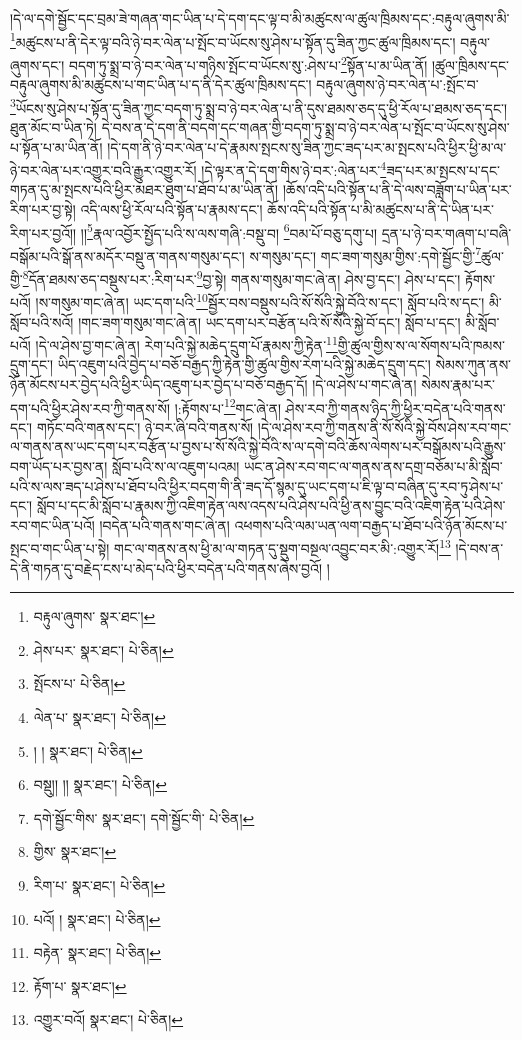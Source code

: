 །དེ་ལ་དགེ་སྦྱོང་དང་བྲམ་ཟེ་གཞན་གང་ཡིན་པ་དེ་དག་དང་ལྟ་བ་མི་མཚུངས་ལ་ཚུལ་ཁྲིམས་དང་:བརྟུལ་ཞུགས་མི་\footnote{བརྟུལ་ཞུགས་  སྣར་ཐང་། }མཚུངས་པ་ནི་དེར་ལྟ་བའི་ཉེ་བར་ལེན་པ་སྤོང་བ་ཡོངས་སུ་ཤེས་པ་སྟོན་དུ་ཟིན་ཀྱང་ཚུལ་ཁྲིམས་དང་། བརྟུལ་ཞུགས་དང་། བདག་ཏུ་སྨྲ་བ་ཉེ་བར་ལེན་པ་གཉིས་སྤོང་བ་ཡོངས་སུ་:ཤེས་པ་\footnote{ཤེས་པར་  སྣར་ཐང་།  པེ་ཅིན། }སྟོན་པ་མ་ཡིན་ནོ། །ཚུལ་ཁྲིམས་དང་བརྟུལ་ཞུགས་མི་མཚུངས་པ་གང་ཡིན་པ་ད་ནི་དེར་ཚུལ་ཁྲིམས་དང་། བརྟུལ་ཞུགས་ཉེ་བར་ལེན་པ་:སྤོང་བ་\footnote{སྤོངས་པ་  པེ་ཅིན། }ཡོངས་སུ་ཤེས་པ་སྟོན་དུ་ཟིན་ཀྱང་བདག་ཏུ་སྨྲ་བ་ཉེ་བར་ལེན་པ་ནི་དུས་ཐམས་ཅད་དུ་ཕྱི་རོལ་པ་ཐམས་ཅད་དང་། ཐུན་མོང་བ་ཡིན་ཏེ། དེ་བས་ན་དེ་དག་ནི་བདག་དང་གཞན་གྱི་བདག་ཏུ་སྨྲ་བ་ཉེ་བར་ལེན་པ་སྤོང་བ་ཡོངས་སུ་ཤེས་པ་སྟོན་པ་མ་ཡིན་ནོ། །དེ་དག་ནི་ཉེ་བར་ལེན་པ་དེ་རྣམས་སྤངས་སུ་ཟིན་ཀྱང་ཟད་པར་མ་སྤངས་པའི་ཕྱིར་ཕྱི་མ་ལ་ཉེ་བར་ལེན་པར་འགྱུར་བའི་རྒྱུར་འགྱུར་རོ། །དེ་ལྟར་ན་དེ་དག་གིས་ཉེ་བར་:ལེན་པར་\footnote{ལེན་པ་  སྣར་ཐང་།  པེ་ཅིན། }ཟད་པར་མ་སྤངས་པ་དང་གཏན་དུ་མ་སྤངས་པའི་ཕྱིར་མཐར་ཐུག་པ་ཐོབ་པ་མ་ཡིན་ནོ། །ཆོས་འདི་པའི་སྟོན་པ་ནི་དེ་ལས་བཟློག་པ་ཡིན་པར་རིག་པར་བྱ་སྟེ། འདི་ལས་ཕྱི་རོལ་པའི་སྟོན་པ་རྣམས་དང་། ཆོས་འདི་པའི་སྟོན་པ་མི་མཚུངས་པ་ནི་དེ་ཡིན་པར་རིག་པར་བྱའོ།། །།\footnote{། །  སྣར་ཐང་།  པེ་ཅིན། }རྣལ་འབྱོར་སྤྱོད་པའི་ས་ལས་གཞི་:བསྡུ་བ། \footnote{བསྡུ།། །།   སྣར་ཐང་།  པེ་ཅིན། }བམ་པོ་བཅུ་དགུ་པ། དྲན་པ་ཉེ་བར་གཞག་པ་བཞི་བསྒོམ་པའི་སྒོ་ནས་མདོར་བསྡུ་ན་གནས་གསུམ་དང་། ས་གསུམ་དང་། གང་ཟག་གསུམ་གྱིས་:དགེ་སྦྱོང་གྱི་\footnote{དགེ་སྦྱོང་གིས་  སྣར་ཐང་། དགེ་སྦྱོང་གི་  པེ་ཅིན། }ཚུལ་གྱི་\footnote{གྱིས་  སྣར་ཐང་། }དོན་ཐམས་ཅད་བསྡུས་པར་:རིག་པར་\footnote{རིག་པ་  སྣར་ཐང་།  པེ་ཅིན། }བྱ་སྟེ། གནས་གསུམ་གང་ཞེ་ན། ཤེས་བྱ་དང་། ཤེས་པ་དང་། རྟོགས་པའོ། །ས་གསུམ་གང་ཞེ་ན། ཡང་དག་པའི་\footnote{པའོ། །  སྣར་ཐང་།  པེ་ཅིན། }སྦྱོར་བས་བསྡུས་པའི་སོ་སོའི་སྐྱེ་བོའི་ས་དང་། སློབ་པའི་ས་དང་། མི་སློབ་པའི་སའོ། །གང་ཟག་གསུམ་གང་ཞེ་ན། ཡང་དག་པར་བརྩོན་པའི་སོ་སོའི་སྐྱེ་བོ་དང་། སློབ་པ་དང་། མི་སློབ་པའོ། །དེ་ལ་ཤེས་བྱ་གང་ཞེ་ན། རེག་པའི་སྐྱེ་མཆེད་དྲུག་པོ་རྣམས་ཀྱི་རྟེན་\footnote{བརྟེན་  སྣར་ཐང་།  པེ་ཅིན། }གྱི་ཚུལ་གྱིས་ས་ལ་སོགས་པའི་ཁམས་དྲུག་དང་། ཡིད་འཇུག་པའི་བྱེད་པ་བཅོ་བརྒྱད་ཀྱི་རྟེན་གྱི་ཚུལ་གྱིས་རེག་པའི་སྐྱེ་མཆེད་དྲུག་དང་། སེམས་ཀུན་ནས་ཉོན་མོངས་པར་བྱེད་པའི་ཕྱིར་ཡིད་འཇུག་པར་བྱེད་པ་བཅོ་བརྒྱད་དོ། །དེ་ལ་ཤེས་པ་གང་ཞེ་ན། སེམས་རྣམ་པར་དག་པའི་ཕྱིར་ཤེས་རབ་ཀྱི་གནས་སོ། །:རྟོགས་པ་\footnote{རྟོག་པ་  སྣར་ཐང་། }གང་ཞེ་ན། ཤེས་རབ་ཀྱི་གནས་ཉིད་ཀྱི་ཕྱིར་བདེན་པའི་གནས་དང་། གཏོང་བའི་གནས་དང་། ཉེ་བར་ཞི་བའི་གནས་སོ། །དེ་ལ་ཤེས་རབ་ཀྱི་གནས་ནི་སོ་སོའི་སྐྱེ་བོས་ཤེས་རབ་གང་ལ་གནས་ནས་ཡང་དག་པར་བརྩོན་པ་བྱས་པ་སོ་སོའི་སྐྱེ་བོའི་ས་ལ་དགེ་བའི་ཆོས་ལེགས་པར་བསྒོམས་པའི་རྒྱུས་བག་ཡོད་པར་བྱས་ན། སློབ་པའི་ས་ལ་འཇུག་པའམ། ཡང་ན་ཤེས་རབ་གང་ལ་གནས་ནས་དགྲ་བཅོམ་པ་མི་སློབ་པའི་ས་ལས་ཟད་པ་ཤེས་པ་ཐོབ་པའི་ཕྱིར་བདག་གི་ནི་ཟད་དོ་སྙམ་དུ་ཡང་དག་པ་ཇི་ལྟ་བ་བཞིན་དུ་རབ་ཏུ་ཤེས་པ་དང་། སློབ་པ་དང་མི་སློབ་པ་རྣམས་ཀྱི་འཇིག་རྟེན་ལས་འདས་པའི་ཤེས་པའི་ཕྱི་ནས་བྱུང་བའི་འཇིག་རྟེན་པའི་ཤེས་རབ་གང་ཡིན་པའོ། །བདེན་པའི་གནས་གང་ཞེ་ན། འཕགས་པའི་ལམ་ཡན་ལག་བརྒྱད་པ་ཐོབ་པའི་ཉོན་མོངས་པ་སྤང་བ་གང་ཡིན་པ་སྟེ། གང་ལ་གནས་ནས་ཕྱི་མ་ལ་གཏན་དུ་སྡུག་བསྔལ་འབྱུང་བར་མི་:འགྱུར་རོ།\footnote{འགྱུར་བའོ།  སྣར་ཐང་།  པེ་ཅིན། } །དེ་བས་ན་དེ་ནི་གཏན་དུ་བརྗེད་ངས་པ་མེད་པའི་ཕྱིར་བདེན་པའི་གནས་ཞེས་བྱའོ། །
